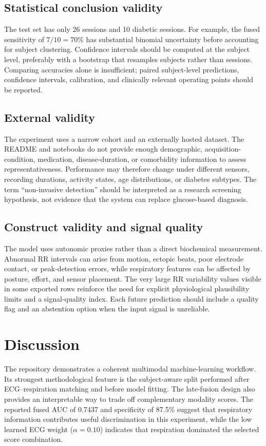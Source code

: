 \documentclass[11pt,a4paper]{article}
\begin{document}
\subsection{Statistical conclusion validity}
The test set has only 26 sessions and 10 diabetic sessions. For example, the fused sensitivity of $7/10=70\%$ has substantial binomial uncertainty before accounting for subject clustering. Confidence intervals should be computed at the subject level, preferably with a bootstrap that resamples subjects rather than sessions. Comparing accuracies alone is insufficient; paired subject-level predictions, confidence intervals, calibration, and clinically relevant operating points should be reported.

\subsection{External validity}
The experiment uses a narrow cohort and an externally hosted dataset. The README and notebooks do not provide enough demographic, acquisition-condition, medication, disease-duration, or comorbidity information to assess representativeness. Performance may therefore change under different sensors, recording durations, activity states, age distributions, or diabetes subtypes. The term ``non-invasive detection'' should be interpreted as a research screening hypothesis, not evidence that the system can replace glucose-based diagnosis.

\subsection{Construct validity and signal quality}
The model uses autonomic proxies rather than a direct biochemical measurement. Abnormal RR intervals can arise from motion, ectopic beats, poor electrode contact, or peak-detection errors, while respiratory features can be affected by posture, effort, and sensor placement. The very large RR variability values visible in some exported rows reinforce the need for explicit physiological plausibility limits and a signal-quality index. Each future prediction should include a quality flag and an abstention option when the input signal is unreliable.

\section{Discussion}
The repository demonstrates a coherent multimodal machine-learning workflow. Its strongest methodological feature is the subject-aware split performed after ECG--respiration matching and before model fitting. The late-fusion design also provides an interpretable way to trade off complementary modality scores. The reported fused AUC of 0.7437 and specificity of 87.5\% suggest that respiratory information contributes useful discrimination in this experiment, while the low learned ECG weight ($\alpha=0.10$) indicates that respiration dominated the selected score combination.
\end{document}
